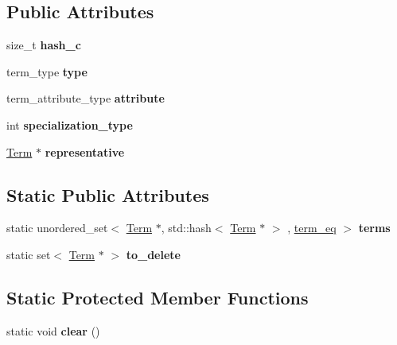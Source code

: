 \subsection*{\-Public \-Attributes}
\begin{DoxyCompactItemize}
\item 
\hypertarget{classTerm_a0154fc4b2a90d16329f310faa2e42535}{size\-\_\-t {\bfseries hash\-\_\-c}}\label{classTerm_a0154fc4b2a90d16329f310faa2e42535}

\item 
\hypertarget{classTerm_ac9aaad86da37f49b7ac0fd9e561eeb2b}{term\-\_\-type {\bfseries type}}\label{classTerm_ac9aaad86da37f49b7ac0fd9e561eeb2b}

\item 
\hypertarget{classTerm_ab01e1866e9977b8c8fd76c3c601e93c0}{term\-\_\-attribute\-\_\-type {\bfseries attribute}}\label{classTerm_ab01e1866e9977b8c8fd76c3c601e93c0}

\item 
\hypertarget{classTerm_abb70538c11fc3a7af3a87bcfc32261b6}{int {\bfseries specialization\-\_\-type}}\label{classTerm_abb70538c11fc3a7af3a87bcfc32261b6}

\item 
\hypertarget{classTerm_a9d43cd23ce7d9ced12fba0c1f7bddb29}{\hyperlink{classTerm}{\-Term} $\ast$ {\bfseries representative}}\label{classTerm_a9d43cd23ce7d9ced12fba0c1f7bddb29}

\end{DoxyCompactItemize}
\subsection*{\-Static \-Public \-Attributes}
\begin{DoxyCompactItemize}
\item 
\hypertarget{classTerm_a83411382cdba54da5e43e7286e272982}{static unordered\-\_\-set$<$ \hyperlink{classTerm}{\-Term} \*
$\ast$, std\-::hash$<$ \hyperlink{classTerm}{\-Term} $\ast$ $>$\*
, \hyperlink{structstd_1_1term__eq}{term\-\_\-eq} $>$ {\bfseries terms}}\label{classTerm_a83411382cdba54da5e43e7286e272982}

\item 
\hypertarget{classTerm_aff98a6cba75cf099e005be04d56623c1}{static set$<$ \hyperlink{classTerm}{\-Term} $\ast$ $>$ {\bfseries to\-\_\-delete}}\label{classTerm_aff98a6cba75cf099e005be04d56623c1}

\end{DoxyCompactItemize}
\subsection*{\-Static \-Protected \-Member \-Functions}
\begin{DoxyCompactItemize}
\item 
\hypertarget{classTerm_ab640d41ead4b1e4bb98c4a31bfe7e170}{static void {\bfseries clear} ()}\label{classTerm_ab640d41ead4b1e4bb98c4a31bfe7e170}

\end{DoxyCompactItemize}
